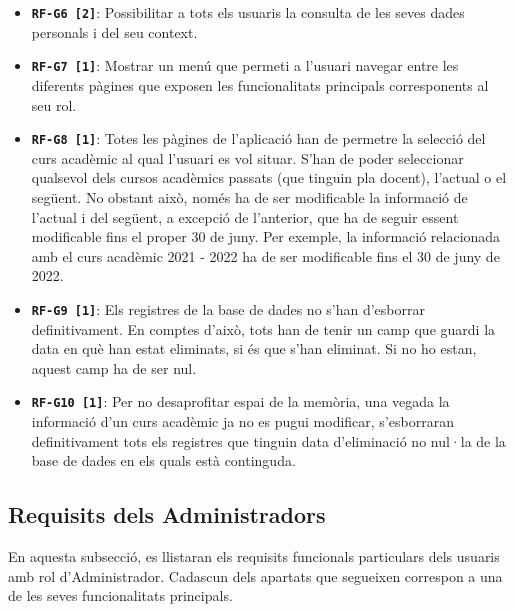 \documentclass[a4paper,12pt]{ThesisStyle}
\begin{document}
\begin{itemize}
  \item \texttt{\textbf{RF-G6 [2]}}: Possibilitar a tots els usuaris la consulta de les seves dades personals i del seu context.
  \item \texttt{\textbf{RF-G7 [1]}}: Mostrar un menú que permeti a l'usuari navegar entre les diferents pàgines que exposen les funcionalitats principals corresponents al seu rol.
  \item \texttt{\textbf{RF-G8 [1]}}: Totes les pàgines de l'aplicació han de permetre la selecció del curs acadèmic al qual l'usuari es vol situar. S'han de poder seleccionar qualsevol dels cursos acadèmics passats (que tinguin pla docent), l'actual o el següent. No obstant això, només ha de ser modificable la informació de l'actual i del següent, a excepció de l'anterior, que ha de seguir essent modificable fins el proper 30 de juny. Per exemple, la informació relacionada amb el curs acadèmic 2021 - 2022 ha de ser modificable fins el 30 de juny de 2022.
  \item \texttt{\textbf{RF-G9 [1]}}: Els registres de la base de dades no s'han d'esborrar definitivament. En comptes d'això, tots han de tenir un camp que guardi la data en què han estat eliminats, si és que s'han eliminat. Si no ho estan, aquest camp ha de ser nul.
  \item \texttt{\textbf{RF-G10 [1]}}: Per no desaprofitar espai de la memòria, una vegada la informació d'un curs acadèmic ja no es pugui modificar, s'esborraran definitivament tots els registres que tinguin data d'eliminació no nul·la de la base de dades en els quals està continguda.
\end{itemize}


\subsection{Requisits dels Administradors}
\label{subsec:requisits_administradors}

En aquesta subsecció, es llistaran els requisits funcionals particulars dels usuaris amb rol d'Administrador. Cadascun dels apartats que segueixen correspon a una de les seves funcionalitats principals.
\end{document}
